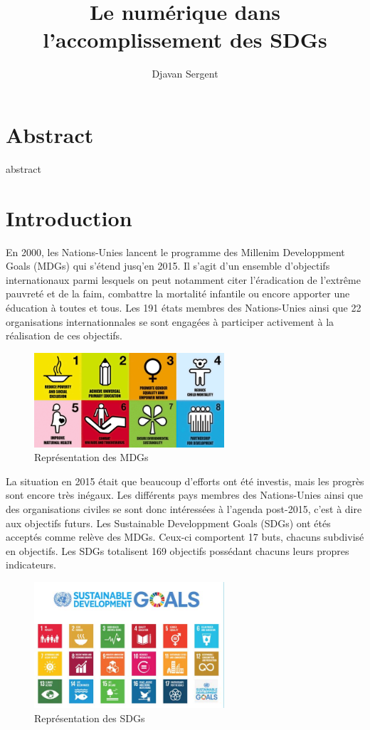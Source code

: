 \documentclass[a4paper,11pt,titlepage]{article}
\title{Le numérique dans l'accomplissement des SDGs}
\author{Djavan Sergent}
\begin{document}
	\maketitle
	\tableofcontents
	\listoffigures
	\listoftables
	
	\section*{Abstract}
		abstract
	
	\section{Introduction}
		En 2000, les Nations-Unies lancent le programme des Millenim Developpment Goals (MDGs) qui s'étend jusq'en 2015. Il s'agit d'un ensemble d'objectifs internationaux parmi lesquels on peut notamment citer l'éradication de l'extrême pauvreté et de la faim, combattre la mortalité infantile ou encore apporter une éducation à toutes et tous. Les 191 états membres des Nations-Unies ainsi que 22 organisations internationnales se sont engagées à participer activement à la réalisation de ces objectifs.
		\begin{figure}
			\begin{center}
				\includegraphics[width=200pt]{mdgs-full.png}
			\end{center}
			\caption{Représentation des MDGs}
		\end{figure}

		La situation en 2015 était que beaucoup d'efforts ont été investis, mais les progrès sont encore très inégaux. Les différents pays membres des Nations-Unies ainsi que des organisations civiles se sont donc intéressées à l'agenda post-2015, c'est à dire aux objectifs futurs. Les Sustainable Developpment Goals (SDGs) ont étés acceptés comme relève des MDGs. Ceux-ci comportent 17 buts, chacuns subdivisé en objectifs. Les SDGs totalisent 169 objectifs possédant chacuns leurs propres indicateurs.
		\begin{figure}
			\begin{center}
				\includegraphics[width=200pt]{sdgs.jpg}
			\end{center}
			\caption{Représentation des SDGs}
		\end{figure}
		
\end{document}
